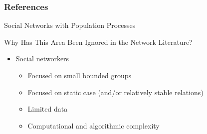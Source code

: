 \documentclass[10pt]{beamer}
\begin{document}
\begin{frame}[allowframebreaks] 
\frametitle{References}
\def\newblock{}


\end{frame}


\begin{frame}{Social Networks with Population Processes}
\addtocounter{framenumber}{-16}

\begin{block}{Why Has This Area Been Ignored in the Network Literature?}

\begin{itemize}
\item Social networkers
\begin{itemize}
\item Focused on small bounded groups
\item Focused on static case (and/or relatively stable relations)
\item Limited data
\item Computational and algorithmic complexity 
\end{itemize}
\end{itemize}
\end{block}

\end{frame}
\end{document}
